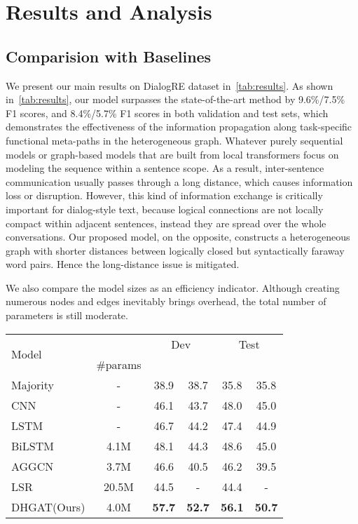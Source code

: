 \documentclass[letterpaper]{article} \usepackage{aaai21}  \usepackage{times}  \usepackage{helvet} \usepackage{courier}  \usepackage[hyphens]{url}  \usepackage{graphicx} \urlstyle{rm} \def\UrlFont{\rm}  \usepackage{natbib}  \usepackage{caption} \frenchspacing  \setlength{\pdfpagewidth}{8.5in}  \setlength{\pdfpageheight}{11in}
\begin{document}
\section{Results and Analysis}
\label{result}
\subsection{Comparision with Baselines}
We present our main results on DialogRE dataset in~\cref{tab:results}. As shown in~\cref{tab:results}, our model surpasses the state-of-the-art method by 9.6\%/7.5\% F1 scores, and 8.4\%/5.7\% F1 scores in both validation and test sets, which demonstrates the effectiveness of the information propagation along task-specific functional meta-paths in the heterogeneous graph.
Whatever purely sequential models or graph-based models that are built from local transformers focus on modeling the sequence within a sentence scope.
As a result, inter-sentence communication usually passes through a long distance, which causes information loss or disruption.
However, this kind of information exchange is critically important for dialog-style text, because logical connections are not locally compact within adjacent sentences,
instead they are spread over the whole conversations.
Our proposed model, on the opposite, constructs a heterogeneous graph with shorter distances between logically closed but syntactically faraway word pairs.
Hence the long-distance issue is mitigated.
\par
We also compare the model sizes as an efficiency indicator.
Although creating numerous nodes and edges inevitably brings overhead, the total number of parameters is still moderate.

\begin{table*}[ht]
\centering
\begin{tabular}{l|c|cccc}
\toprule
\multirow{2}{*}{Model} & &
\multicolumn{2}{c}{Dev} &
\multicolumn{2}{c}{Test} \\
& \#params &  &  &  &  \\
\midrule
Majority~\cite{yu2020dialogue} & - & 38.9 & 38.7 & 35.8 & 35.8 \\
CNN~\cite{yu2020dialogue} & - & 46.1 & 43.7 & 48.0 & 45.0 \\
LSTM~\cite{yu2020dialogue} & - & 46.7 & 44.2 & 47.4 & 44.9 \\
BiLSTM~\cite{yu2020dialogue} & 4.1M & 48.1 & 44.3 & 48.6 & 45.0 \\
\midrule
AGGCN~\cite{guo2019attention} & 3.7M & 46.6 & 40.5 & 46.2 & 39.5 \\
LSR~\cite{nan2020reasoning} & 20.5M & 44.5 & - & 44.4 & - \\
\midrule
DHGAT(Ours) & 4.0M & \textbf{57.7} & \textbf{52.7} & \textbf{56.1} & \textbf{50.7} \\
\bottomrule
\end{tabular}
\caption{Main results on DialogRE dataset. Values in the \#params column refer to parameter sizes of the models.  and  are macro F1 scores under standard setting and conversational setting, respectively. The unit of all the scores is \%.}
\label{tab:results}
\end{table*}
\end{document}
